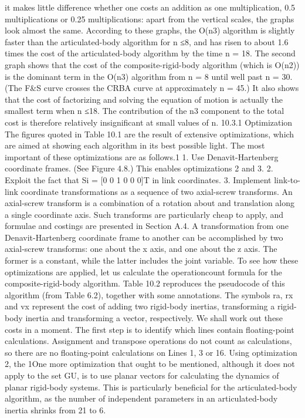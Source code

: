 it makes little difference whether one costs an addition as one multiplication, 0.5 multiplications or 0.25 multiplications: apart from the vertical scales, the graphs look almost the same. According to these graphs, the O(n3) algorithm is slightly faster than the articulated-body algorithm for n ≤8, and has risen to about 1.6 times the cost of the articulated-body algorithm by the time n = 18. The second graph shows that the cost of the composite-rigid-body algorithm (which is O(n2)) is the dominant term in the O(n3) algorithm from n = 8 until well past n = 30. (The F\&S curve crosses the CRBA curve at approximately n = 45.) It also shows that the cost of factorizing and solving the equation of motion is actually the smallest term when n ≤18. The contribution of the n3 component to the total cost is therefore relatively insignificant at small values of n. 10.3.1 Optimization The figures quoted in Table 10.1 are the result of extensive optimizations, which are aimed at showing each algorithm in its best possible light. The most important of these optimizations are as follows.1 1. Use Denavit-Hartenberg coordinate frames. (See Figure 4.8.) This enables optimizations 2 and 3. 2. Exploit the fact that Si = [0 0 1 0 0 0]T in link coordinates. 3. Implement link-to-link coordinate transformations as a sequence of two axial-screw transforms. An axial-screw transform is a combination of a rotation about and translation along a single coordinate axis. Such transforms are particularly cheap to apply, and formulae and costings are presented in Section A.4. A transformation from one Denavit-Hartenberg coordinate frame to another can be accomplished by two axial-screw transforms: one about the x axis, and one about the z axis. The former is a constant, while the latter includes the joint variable. To see how these optimizations are applied, let us calculate the operationcount formula for the composite-rigid-body algorithm. Table 10.2 reproduces the pseudocode of this algorithm (from Table 6.2), together with some annotations. The symbols ra, rx and vx represent the cost of adding two rigid-body inertias, transforming a rigid-body inertia and transforming a vector, respectively. We shall work out these costs in a moment. The first step is to identify which lines contain floating-point calculations. Assignment and transpose operations do not count as calculations, so there are no floating-point calculations on Lines 1, 3 or 16. Using optimization 2, the 1One more optimization that ought to be mentioned, although it does not apply to the set GU, is to use planar vectors for calculating the dynamics of planar rigid-body systems. This is particularly beneficial for the articulated-body algorithm, as the number of independent parameters in an articulated-body inertia shrinks from 21 to 6.

